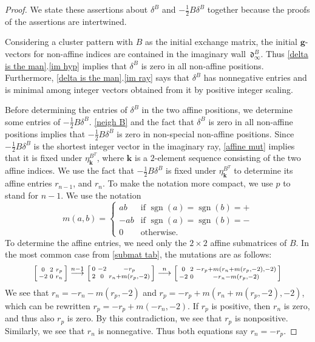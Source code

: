 \documentclass{amsart}
\theoremstyle{definition}
\theoremstyle{remark}
\numberwithin{equation}{section}
\newcommand{\sgn}{\operatorname{sgn}}
\newcommand{\0}{{\mathbf{0}}}
\newcommand{\g}{\mathbf{g}}
\newcommand{\kk}{\mathbf{k}}
\renewcommand{\d}{{\mathfrak d}}
\begin{document}
\begin{proof}
We state these assertions about $\delta^B$ and $-\frac12B\delta^B$ together because the proofs of the assertions are intertwined.

Considering a cluster pattern with $B$ as the initial exchange matrix, the initial $\g$-vectors for non-affine indices are contained in the imaginary wall~$\d^B_\infty$.
Thus \cref{delta is the man}.\ref{im hyp} implies that $\delta^B$ is zero in all non-affine positions.
Furthermore, \cref{delta is the man}.\ref{im ray} says that $\delta^B$ has nonnegative entries and is minimal among integer vectors obtained from it by positive integer scaling.

Before determining the entries of $\delta^B$ in the two affine positions, we determine some entries of $-\frac12B\delta^B$.
\cref{neigh B} and the fact that $\delta^B$ is zero in all non-affine positions implies that $-\frac12B\delta^B$ is zero in non-special non-affine positions.
Since $-\frac12B\delta^B$ is the shortest integer vector in the imaginary ray, \cref{affine mut} implies that it is fixed under $\eta^{B^T}_\kk$, where $\kk$ is a $2$-element sequence consisting of the two affine indices. 
We use the fact that $-\frac12B\delta^B$ is fixed under $\eta^{B^T}_\kk$ to determine its affine entries $r_{n-1}$, and $r_n$.
To make the notation more compact, we use $p$ to stand for $n-1$.
We use the notation 
\[m(a,b)=\begin{cases}
ab&\text{if }\sgn(a)=\sgn(b)=+\\
-ab&\text{if }\sgn(a)=\sgn(b)=-\\
0&\text{otherwise}.
\end{cases}\]
To determine the affine entries, we need only the $2\times2$ affine submatrices of $B$.
In the most common case from \cref{submat tab}, the mutations are as follows:
\[
\begin{bsmallmatrix*}
0 & 2 & r_p\\
-2 & 0 & r_n
\end{bsmallmatrix*}\overset{n-1}{\longrightarrow}
\begin{bsmallmatrix*}
0 & -2 & -r_p\\
2 & 0 & r_n+m(r_p,-2)
\end{bsmallmatrix*}\overset{n}{\longrightarrow}
\begin{bsmallmatrix*}
0 & 2 & -r_p+m(r_n+m(r_p,-2),-2)\\
-2 & 0 & -r_n-m(r_p,-2)
\end{bsmallmatrix*}
\]
We see that $r_n=-r_n-m(r_p,-2)$ and $r_p=-r_p+m(r_n+m(r_p,-2),-2)$, which can be rewritten $r_p=-r_p+m(-r_n,-2)$.
If $r_p$ is positive, then $r_n$ is zero, and thus also $r_p$ is zero.
By this contradiction, we see that $r_p$ is nonpositive.
Similarly, we see that $r_n$ is nonnegative.
Thus both equations say $r_n=-r_p$.


\end{proof}
\end{document}
